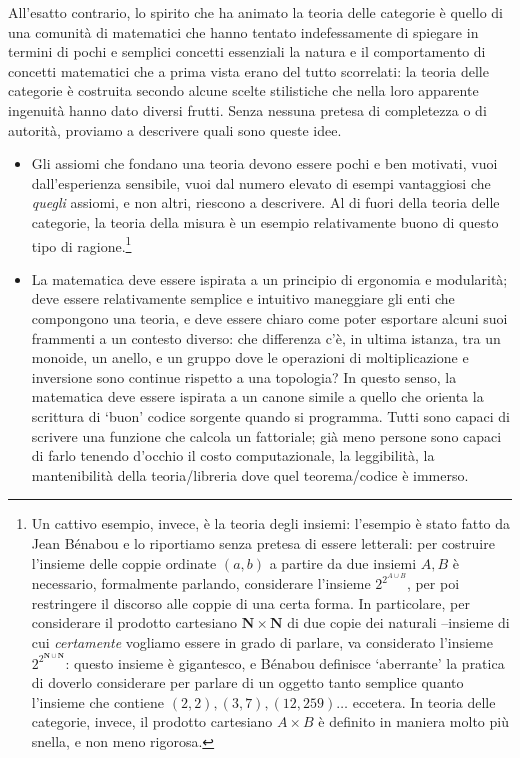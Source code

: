 All'esatto contrario, lo spirito che ha animato la teoria delle categorie è quello di una comunità di matematici che hanno tentato indefessamente di spiegare in termini di pochi e semplici concetti essenziali la natura e il comportamento di concetti matematici che a prima vista erano del tutto scorrelati: la teoria delle categorie è costruita secondo alcune scelte stilistiche che nella loro apparente ingenuità hanno dato diversi frutti. Senza nessuna pretesa di completezza o di autorità, proviamo a descrivere quali sono queste idee.
\begin{itemize}
  \item Gli assiomi che fondano una teoria devono essere pochi e ben motivati, vuoi dall'esperienza sensibile, vuoi dal numero elevato di esempi vantaggiosi che \emph{quegli} assiomi, e non altri, riescono a descrivere. Al di fuori della teoria delle categorie, la teoria della misura è un esempio relativamente buono di questo tipo di ragione.\footnote{Un cattivo esempio, invece, è la teoria degli insiemi: l'esempio è stato fatto da Jean Bénabou e lo riportiamo senza pretesa di essere letterali: per costruire l'insieme delle coppie ordinate $(a,b)$ a partire da due insiemi $A,B$ è necessario, formalmente parlando, considerare l'insieme $2^{2^{A\cup B}}$, per poi restringere il discorso alle coppie di una certa forma. In particolare, per considerare il prodotto cartesiano $\mathbf{N} \times \mathbf{N}$ di due copie dei naturali --insieme di cui \emph{certamente} vogliamo essere in grado di parlare, va considerato l'insieme $2^{2^{\mathbf{N} \cup \mathbf{N}}}$: questo insieme è gigantesco, e Bénabou definisce `aberrante' la pratica di doverlo considerare per parlare di un oggetto tanto semplice quanto l'insieme che contiene $(2,2), (3,7), (12, 259)\dots$ eccetera. In teoria delle categorie, invece, il prodotto cartesiano $A\times B$ è definito in maniera molto più snella, e non meno rigorosa.}
  \item La matematica deve essere ispirata a un principio di ergonomia e modularità; deve essere relativamente semplice e intuitivo maneggiare gli enti che compongono una teoria, e deve essere chiaro come poter esportare alcuni suoi frammenti a un contesto diverso: che differenza c'è, in ultima istanza, tra un monoide, un anello, e un gruppo dove le operazioni di moltiplicazione e inversione sono continue rispetto a una topologia? In questo senso, la matematica deve essere ispirata a un canone simile a quello che orienta la scrittura di `buon' codice sorgente quando si programma. Tutti sono capaci di scrivere una funzione che calcola un fattoriale; già meno persone sono capaci di farlo tenendo d'occhio il costo computazionale, la leggibilità, la mantenibilità della teoria/libreria dove quel teorema/codice è immerso.

\end{itemize}
